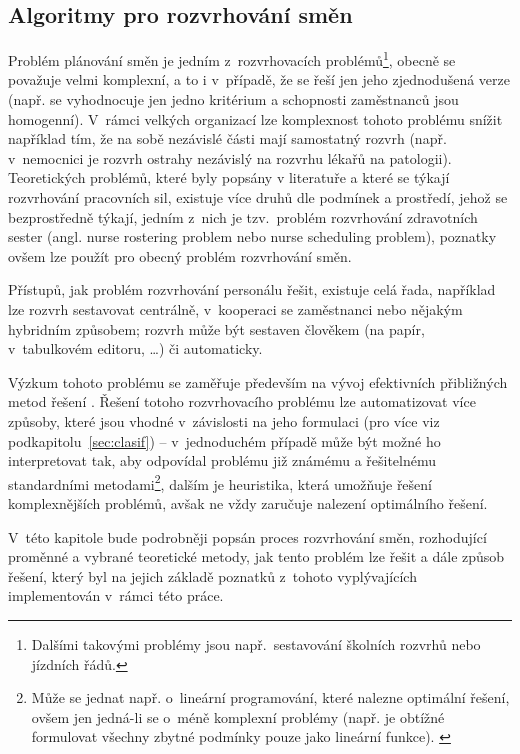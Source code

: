 \documentclass[twoside]{ctuthesis}
\begin{document}
\begin{enumerate}[label=\textbf{O\arabic*.}]
\chapter{Algoritmy pro rozvrhování směn}
Problém plánování směn je jedním z~rozvrhovacích problémů\footnote{Dalšími takovými problémy jsou např.~sestavování školních rozvrhů nebo jízdních řádů.}, obecně se považuje velmi komplexní, a to i v~případě, že se řeší jen jeho zjednodušená verze (např. se vyhodnocuje jen jedno kritérium a schopnosti zaměstnanců jsou homogenní). V~rámci velkých organizací lze komplexnost tohoto problému snížit například tím, že na sobě nezávislé části mají samostatný rozvrh (např. v~nemocnici je rozvrh ostrahy nezávislý na rozvrhu lékařů na patologii). Teoretických problémů, které byly popsány v literatuře a které se týkají rozvrhování pracovních sil, existuje více druhů dle podmínek a prostředí, jehož se bezprostředně týkají, jedním z~nich je tzv.~problém rozvrhování zdravotních sester (angl. nurse rostering problem nebo nurse scheduling problem), poznatky ovšem lze použít pro obecný problém rozvrhování směn.

Přístupů, jak problém rozvrhování personálu řešit, existuje celá řada, například lze rozvrh sestavovat centrálně, v~kooperaci se zaměstnanci nebo nějakým hybridním způsobem; rozvrh může být sestaven člověkem (na papír, v~tabulkovém editoru, \ldots) či automaticky.

Výzkum tohoto problému se zaměřuje především na vývoj efektivních přibližných metod řešení \cite{adamuthe2012tabu}. Řešení totoho rozvrhovacího problému lze automatizovat více způsoby, které jsou vhodné v~závislosti na jeho formulaci (pro více viz podkapitolu~\ref{sec:clasif}) -- v~jednoduchém případě může být možné ho interpretovat tak, aby odpovídal problému již známému a řešitelnému standardními metodami\footnote{Může se jednat např. o~lineární programování, které nalezne optimální řešení, ovšem jen jedná-li se o~méně komplexní problémy (např. je obtížné formulovat všechny zbytné podmínky pouze jako lineární funkce). \cite{blochliger2004modeling}}, dalším je heuristika, která umožňuje řešení komplexnějších problémů, avšak ne vždy zaručuje nalezení optimálního řešení. \cite{blochliger2004modeling}

V~této kapitole bude podrobněji popsán proces rozvrhování směn, rozhodující proměnné a vybrané teoretické metody, jak tento problém lze řešit a dále způsob řešení, který byl na jejich základě poznatků z~tohoto vyplývajících implementován v~rámci této práce.


\end{enumerate}
\end{document}
